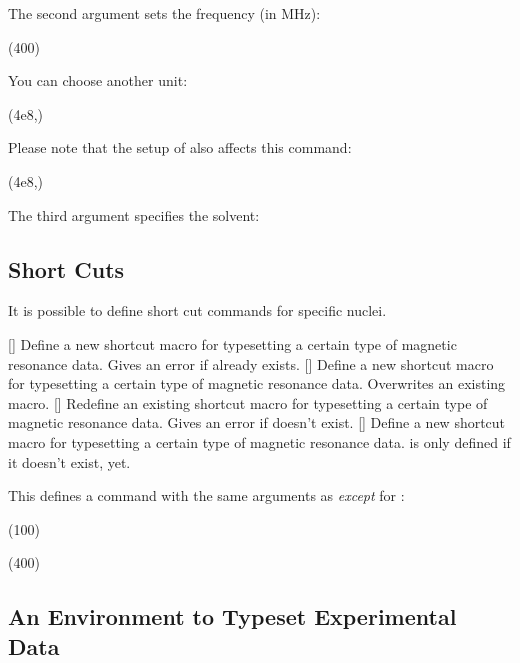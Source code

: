 \documentclass{chemmacros-manual}
\begin{document}
The second argument sets the frequency (in \unit{\mega\hertz}):
\begin{example}
  \NMR(400)
\end{example}
You can choose another unit:
\begin{example}
  \NMR(4e8,\hertz)
\end{example}
Please note that the setup of  also affects this command:
\begin{example}
  \NMR(4e8,\hertz)
\end{example}

The third argument specifies the solvent:
\begin{example}
  \NMR[CDCl3]
\end{example}

\subsection{Short Cuts}

It is possible to define short cut commands for specific nuclei.
\begin{commands}
  []
    Define a new shortcut macro for typesetting a certain type of magnetic
    resonance data.  Gives an error if  already exists.
  []
    Define a new shortcut macro for typesetting a certain type of magnetic
    resonance data.  Overwrites an existing macro.
  []
    Redefine an existing shortcut macro for typesetting a certain type of
    magnetic resonance data.  Gives an error if  doesn't exist.
  []
    Define a new shortcut macro for typesetting a certain type of magnetic
    resonance data.   is only defined if it doesn't exist, yet.
\end{commands}

This defines a command with the same arguments as  \emph{except} for
:
\begin{example}
  \NewChemNMR{}%
  \NewChemNMR{}%
  \CNMR*(100) \par
  \HNMR*(400)
\end{example}

\subsection{An Environment to Typeset Experimental Data}
\end{document}
